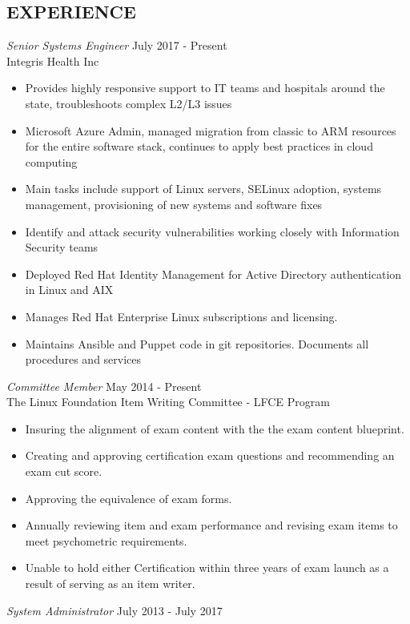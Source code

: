 \documentclass[margin]{res}
\begin{document}
\begin{resume}
\section{EXPERIENCE}
	{\sl Senior Systems Engineer} \hfill July 2017 - Present \\
Integris Health Inc
\begin{itemize}  \itemsep -2pt %
	\item Provides highly responsive support to IT teams and hospitals around the state, troubleshoots complex L2/L3 issues
	\item Microsoft Azure Admin, managed migration from classic to ARM resources for the entire software stack, continues to apply best practices in cloud computing
	\item Main tasks include support of Linux servers, SELinux adoption, systems management, provisioning of new systems and software fixes
	\item Identify and attack security vulnerabilities working closely with Information Security teams
	\item Deployed Red Hat Identity Management for Active Directory authentication in Linux and AIX
	\item Manages Red Hat Enterprise Linux subscriptions and licensing.
	\item Maintains Ansible and Puppet code in git repositories. Documents all procedures and services
	\end{itemize}
	{\sl Committee Member} \hfill May 2014 - Present \\
    The Linux Foundation Item Writing Committee - LFCE Program
    \begin{itemize}  \itemsep -2pt %
    \item Insuring the alignment of exam content with the the exam content blueprint.
    \item Creating and approving certification exam questions and recommending an exam cut score.
    \item Approving the equivalence of exam forms.
    \item Annually reviewing item and exam performance and revising exam items to meet psychometric requirements.
    \item Unable to hold either Certification within three years of exam launch as a result of serving as an item writer.
    \end{itemize}
	{\sl System Administrator} \hfill July 2013 - July 2017 \\

\end{resume}
\end{document}
